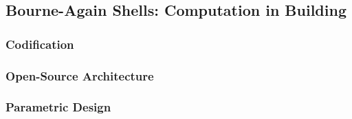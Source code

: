 \subsection{Bourne-Again Shells: Computation in Building}

\subsubsection{Codification}

\subsubsection{Open-Source Architecture}

\subsubsection{Parametric Design}

